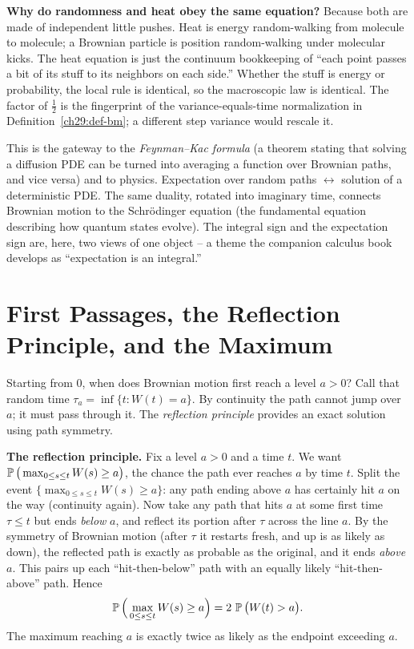 \begin{happeningbox}
\textbf{Why do randomness and heat obey the same equation?} Because both are made
of independent little pushes. Heat is energy random-walking from molecule to
molecule; a Brownian particle is position random-walking under molecular kicks.
The heat equation is just the continuum bookkeeping of ``each point passes a bit
of its stuff to its neighbors on each side.'' Whether the stuff is energy or
probability, the local rule is identical, so the macroscopic law is identical. The
factor of $\tfrac12$ is the fingerprint of the variance-equals-time normalization
in Definition~\ref{ch29:def-bm}; a different step variance would rescale it.
\end{happeningbox}

\begin{connectionbox}
This is the gateway to the \emph{Feynman--Kac formula} (a theorem stating that solving a
diffusion PDE can be turned into averaging a function over Brownian paths, and
vice versa) and to physics. Expectation over random paths $\leftrightarrow$ solution of a
deterministic PDE. The same duality, rotated into imaginary time, connects
Brownian motion to the Schr\"odinger equation (the fundamental equation describing how quantum states evolve). The integral
sign and the expectation sign are, here, two views of one object -- a theme the
companion calculus book develops as ``expectation is an integral.''
\end{connectionbox}

\section{First Passages, the Reflection Principle, and the Maximum}
\label{ch29:reflection}

Starting from $0$, when does Brownian motion first reach a
level $a>0$? Call that random time $\tau_a = \inf\{t: W(t)=a\}$. By continuity the
path cannot jump over $a$; it must pass through it. The \emph{reflection principle}
provides an exact solution using path symmetry.

\begin{whybox}
\textbf{The reflection principle.} Fix a level $a>0$ and a time $t$. We want
$\P\big(\max_{0\le s\le t} W(s) \ge a\big)$, the chance the path ever reaches $a$
by time $t$. Split the event $\{\max_{0\le s\le t} W(s)\ge a\}$: any path ending above $a$ has certainly
hit $a$ on the way (continuity again). Now take any path that hits $a$ at some
first time $\tau\le t$ but ends \emph{below} $a$, and reflect its portion after
$\tau$ across the line $a$. By the symmetry of Brownian motion (after $\tau$ it
restarts fresh, and up is as likely as down), the reflected path is exactly as
probable as the original, and it ends \emph{above} $a$. This pairs up each
``hit-then-below'' path with an equally likely ``hit-then-above'' path. Hence
\[
  \P\Big(\max_{0\le s\le t} W(s)\ge a\Big) = 2\,\P\big(W(t)>a\big).
\]
The maximum reaching $a$ is exactly twice as likely as the endpoint exceeding $a$.
\end{whybox}

